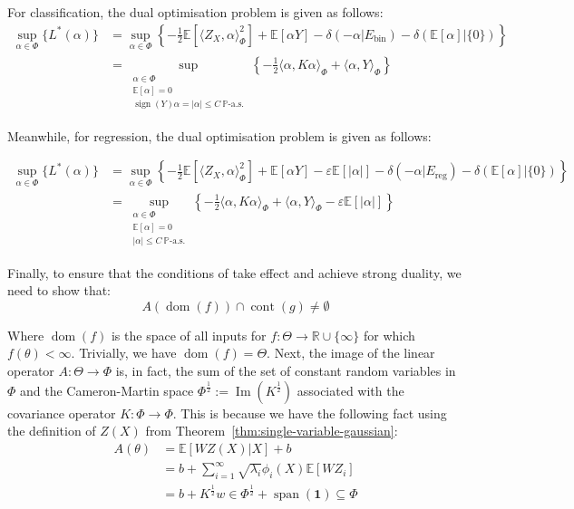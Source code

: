 \documentclass{article}
\begin{document}
For classification, the dual optimisation problem is given as follows:
\begin{align}\label{classification-dual}
\sup_{\alpha \in \Phi}  \{ L^{*}(\alpha)  \} 
& = \sup_{\alpha \in \Phi} \left\{-\frac{1}{2} \mathbb{E}[\langle Z_X , \alpha \rangle_{\Phi}^2] + \mathbb{E} [\alpha Y ] - \delta(-\alpha | E_{\text{bin}}) - \delta(\mathbb{E}[\alpha]|\{0\})\right\} \\
& = \sup_{\substack{\alpha \in \Phi \\ \mathbb{E}[\alpha] = 0 \\\operatorname{sign}(Y) \alpha = |\alpha |\leq C \ \mathbb{P}\text{-a.s.}}} \left\{-\frac{1}{2} \langle \alpha , K \alpha \rangle_{\Phi} + \langle \alpha , Y \rangle_{\Phi}\right\}
\end{align}

Meanwhile, for regression, the dual optimisation problem is given as follows:

\begin{align}\label{regression-dual}
\sup_{\alpha \in \Phi}\{L^{*}(\alpha)\} & = \sup_{\alpha \in \Phi}\left\{-\frac{1}{2}\mathbb{E}[\langle Z_X , \alpha \rangle_{\Phi}^2] + \mathbb{E}[\alpha Y]- \varepsilon \mathbb{E}[ |\alpha |]  -\delta(-\alpha | E_{\text{reg}}) - \delta(\mathbb{E}[\alpha]|\{0\})\right\} \\
 & = \sup_{\substack{\alpha \in \Phi \\ \mathbb{E}[\alpha] = 0 \\ |\alpha |\leq C \ \mathbb{P}\text{-a.s.}}} \left\{-\frac{1}{2} \langle \alpha , K \alpha \rangle_{\Phi} + \langle \alpha , Y \rangle_{\Phi} - \varepsilon \mathbb{E}[|\alpha |]\right\}
\end{align}

Finally, to ensure that the conditions of \cite[Theorem 4.4.3]{Borwein2005-ky} take effect and achieve strong duality, we need to show that: 
\begin{equation}
A(\operatorname{dom}(f)) \cap \operatorname{cont}(g) \neq \emptyset
\end{equation}

Where $\operatorname{dom}(f)$ is the space of all inputs for $f : \Theta \rightarrow \mathbb{R} \cup \{\infty\}$ for which $f(\theta) < \infty$. Trivially, we have $\operatorname{dom}(f) = \Theta$. Next, the image of the linear operator $A : \Theta \rightarrow \Phi$ is, in fact, the sum of the set of constant random variables in $\Phi$ and the Cameron-Martin space $\Phi^{\frac{1}{2}} := \operatorname{Im}(K^{\frac{1}{2}})$ associated with the covariance operator $K : \Phi \rightarrow \Phi$. This is because we have the following fact using the definition of $Z(X)$ from Theorem~\ref{thm:single-variable-gaussian}:
\begin{align}
A(\theta) & = \mathbb{E}[W Z(X)| X] + b \\
 & = b + \sum_{i = 1}^{\infty} \sqrt{\lambda_i} \phi_i (X) \mathbb{E}[W Z_i] \\
 & = b + K^{\frac{1}{2}} w \in \Phi^{\frac{1}{2}} + \operatorname{span}(\mathbf{1}) \subseteq \Phi
\end{align}
\end{document}
